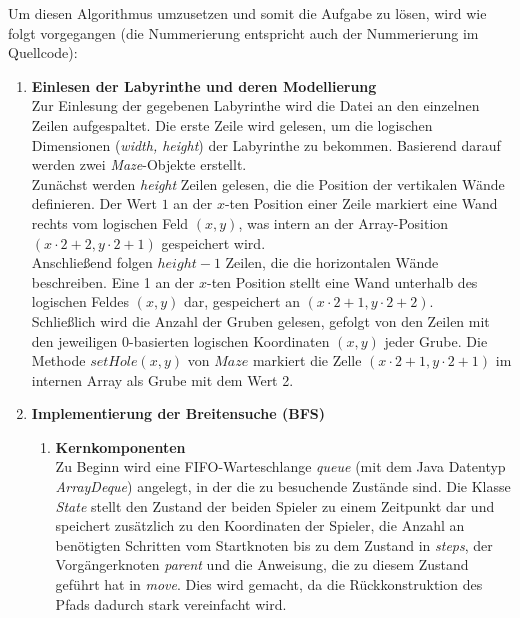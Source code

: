 \documentclass[a4paper,10pt,ngerman]{scrartcl}
\begin{document}
Um diesen Algorithmus umzusetzen und somit die Aufgabe zu lösen, wird wie folgt vorgegangen (die Nummerierung entspricht auch der Nummerierung im Quellcode): 
\begin{enumerate}
  \item \textbf{Einlesen der Labyrinthe und deren Modellierung}\\
  Zur Einlesung der gegebenen Labyrinthe wird die Datei an den einzelnen Zeilen aufgespaltet. Die erste Zeile wird gelesen, um die logischen Dimensionen (\textit{width, height}) der Labyrinthe zu bekommen. Basierend darauf werden zwei \textit{Maze}-Objekte erstellt. 
  \\
  Zunächst werden \textit{height} Zeilen gelesen, die die Position der vertikalen Wände definieren. Der Wert $1$ an der $x$-ten Position einer Zeile markiert eine Wand rechts vom logischen Feld $(x, y)$, was intern an der Array-Position $(x\cdot2+2, y\cdot2+1)$ gespeichert wird.
  \\
  Anschließend folgen $height - 1$ Zeilen, die die horizontalen Wände beschreiben. Eine 1 an der $x$-ten Position stellt eine Wand unterhalb des logischen Feldes $(x, y)$ dar, gespeichert an $(x\cdot2+1, y\cdot2+2)$. 
  \\
  Schließlich wird die Anzahl der Gruben gelesen, gefolgt von den Zeilen mit den jeweiligen 0-basierten logischen Koordinaten $(x, y)$ jeder Grube. Die Methode $setHole(x, y)$ von $Maze$ markiert die Zelle $(x\cdot2+1, y\cdot2+1)$ im internen Array als Grube mit dem Wert 2. 
  \item \textbf{Implementierung der Breitensuche (BFS)}
  \begin{enumerate}
    \item \textbf{Kernkomponenten}\\
    Zu Beginn wird eine FIFO-Warteschlange \textit{queue} (mit dem Java Datentyp \textit{ArrayDeque}) angelegt, in der die zu besuchende Zustände sind. Die Klasse \textit{State} stellt den Zustand der beiden Spieler zu einem Zeitpunkt dar und speichert zusätzlich zu den Koordinaten der Spieler, die Anzahl an benötigten Schritten vom Startknoten bis zu dem Zustand in \textit{steps}, der Vorgängerknoten \textit{parent} und die Anweisung, die zu diesem Zustand geführt hat in \textit{move}. Dies wird gemacht, da die Rückkonstruktion des Pfads dadurch stark vereinfacht wird. 
    \\\newline

\end{enumerate}
\end{enumerate}
\end{document}

